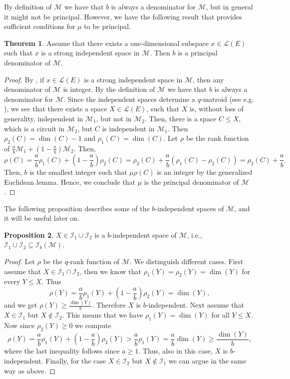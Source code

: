 \documentclass[a4paper,11pt,reqno]{amsart}
\theoremstyle{definition}
\newtheorem{theorem}{Theorem}[section]
\newtheorem{proposition}[theorem]{{{Proposition}}}
\newcommand{\mM}{\mathcal{M}}
\newcommand{\mL}{\mathcal{L}}
\newcommand{\mI}{\mathcal{I}}
\begin{document}
{By definition of $\mM$ we have that $b$ is always a denominator for $\mM$, but in general it might not be principal. 
However, we have the following result that provides sufficient conditions for $\mu$ to be principal.




\begin{theorem}
    Assume that there exists a one-dimensional subspace $x\in\mL(E)$ such that $x$ is a strong independent space in $\mM$. Then $b$ is a principal denominator of $\mM$.
\end{theorem}
\begin{proof}
By \cite[Rem. 2.7]{gluesing2022q}, if $x\in\mL(E)$ is a strong independent space in $\mM$, then any denominator of $\mM$ is integer. By the definition of $\mM$ we have that $b$ is always a denominator for $\mM$. Since the independent spaces determine a $q$-matroid (see e.g. \cite{byrne2022constructions}), we see that there exists a space $X\in\mL(E)$, such that $X$ is, without loss of generality, independent in $\mM_1$, but not in $\mM_2$. Then, there is a space $C\leq X$, which is a circuit in $\mM_2$, but $C$ is independent in $\mM_1$. Then $\rho_2(C)=\dim(C)-1$ and $\rho_1(C) = \dim(C)$. 
Let $\rho$ be the rank function of $\frac{a}{b}\mM_1 + (1-\frac{a}{b})\mM_2$.
Then,
$$\rho(C) = \frac{a}{b}\rho_1(C) + \left(1-\frac{a}{b}\right)\rho_2(C) = \rho_2(C) + \frac{a}{b}\left(\rho_1(C) - \rho_2(C)\right) = \rho_2(C) + \frac{a}{b}.$$
Then, $b$ is the smallest integer such that $\mu\rho(C)$ is an integer by the generalized Euclidean lemma. Hence, we conclude that $\mu$ is the principal denominator of $\mM$.
\end{proof}


The following proposition describes some of the $b$-independent spaces of $\mM$, and it will be useful later on.

\begin{proposition}\label{prop: mu_indeps_conv_comb}
$X\in\mI_1\cup\mI_2$ is a $b$-independent space of $\mM$, i.e., $\mI_1\cup\mI_2\subseteq\mI_b(\mM)$.
\end{proposition}
\begin{proof}
Let $\rho$ be the $q$-rank function of $\mM$. We distinguish different cases. First assume that $X\in\mI_1\cap\mI_2$, then we know that $\rho_1(Y)=\rho_2(Y)=\dim(Y)$ for every $Y\leq X$. Thus
$$\rho(Y)=\frac{a}{b}\rho_1(Y)+\left(1-\frac{a}{b}\right)\rho_2(Y)=\dim(Y),
$$
and we get $\rho(Y)\geq\frac{\dim(Y)}{b}$. Therefore $X$ is $b$-independent. Next assume that $X\in\mI_1$ but $X\not\in\mI_2$. This means that we have $\rho_1(Y)=\dim(Y)$ for all $Y\leq X$. Now since $\rho_2(Y)\geq 0$ we compute
$$\rho(Y)=\frac{a}{b}\rho_1(Y)+\left(1-\frac{a}{b}\right)\rho_2(Y)>\frac{a}{b}\rho_1(Y)=\frac{a}{b}\dim(Y)\geq\frac{\dim(Y)}{b},
$$
where the last inequality follows since $a\geq 1$.
Thus, also in this case, $X$ is $b$-independent. Finally, for the case $X\in\mI_2$ but $X\not\in\mI_1$ we can argue in the same way as above.
\end{proof}

}
\end{document}

